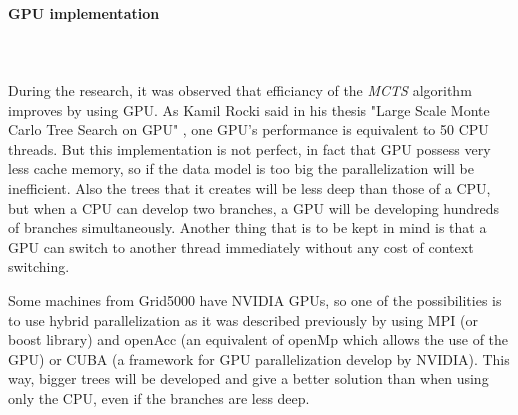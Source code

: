 \paragraph{GPU implementation}\mbox{}\\\mbox{}\\

During the research, it was observed that efficiancy of the \emph{MCTS} algorithm improves by using GPU. As Kamil Rocki said in his thesis "Large Scale Monte Carlo Tree Search on GPU"\cite{GPU} , one GPU's performance is equivalent to 50 CPU threads. But this implementation is not perfect, in fact that GPU possess very less cache memory, so if the data model is too big the parallelization will be inefficient. Also the trees that it creates will be less deep than those of a CPU, but when a CPU can develop two branches, a GPU will be developing hundreds of branches simultaneously. Another thing that is to be kept in mind is that a GPU can switch to another thread immediately without any cost of context switching. 

Some machines from Grid5000 have NVIDIA GPUs, so one of the possibilities is to use hybrid parallelization as it was described previously by using MPI (or boost library) and openAcc (an equivalent of openMp which allows the use of the GPU) or CUBA (a framework for GPU parallelization develop by NVIDIA). This way, bigger trees will be developed and give a better solution than when using only the CPU, even if the branches are less deep.